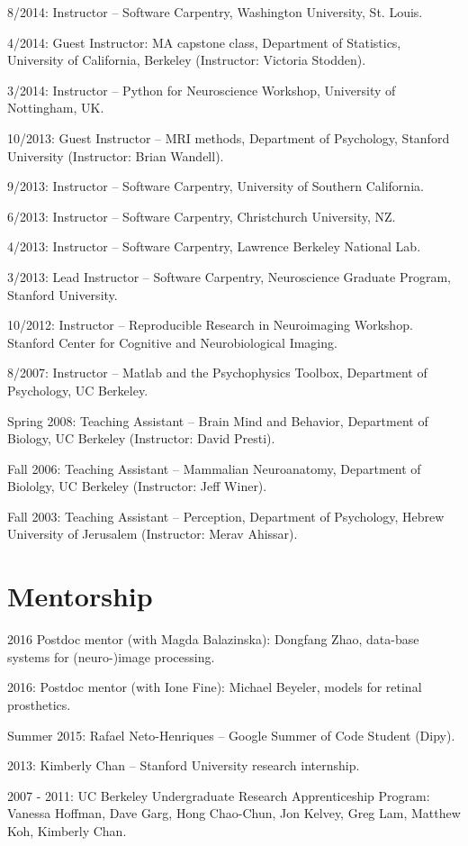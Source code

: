 \documentclass[11pt,fullpage]{article}
\begin{document}
8/2014: Instructor -- Software Carpentry, Washington University, St. Louis.

4/2014: Guest Instructor: MA capstone class, Department of Statistics, University of California, Berkeley (Instructor: Victoria Stodden).

3/2014: Instructor -- Python for Neuroscience Workshop, University of Nottingham, UK.

10/2013: Guest Instructor -- MRI methods, Department of Psychology, Stanford University (Instructor: Brian Wandell).

9/2013: Instructor -- Software Carpentry, University of Southern California.

6/2013: Instructor -- Software Carpentry, Christchurch University, NZ.

4/2013: Instructor -- Software Carpentry, Lawrence Berkeley National Lab.

3/2013: Lead Instructor -- Software Carpentry, Neuroscience Graduate Program, Stanford University.

10/2012: Instructor -- Reproducible Research in Neuroimaging Workshop. Stanford Center for Cognitive and Neurobiological Imaging.

8/2007: Instructor -- Matlab and the Psychophysics Toolbox, Department of Psychology, UC Berkeley.

Spring 2008: Teaching Assistant -- Brain Mind and Behavior, Department of Biology, UC Berkeley (Instructor: David Presti).

Fall 2006: Teaching Assistant -- Mammalian Neuroanatomy, Department of Biololgy, UC Berkeley (Instructor: Jeff Winer).

Fall 2003: Teaching Assistant -- Perception, Department of Psychology, Hebrew University of Jerusalem (Instructor: Merav Ahissar).

\section*{Mentorship}

2016 Postdoc mentor (with Magda Balazinska): Dongfang Zhao, data-base systems for (neuro-)image processing.

2016: Postdoc mentor (with Ione Fine): Michael Beyeler, models for retinal prosthetics.

Summer 2015: Rafael Neto-Henriques -- Google Summer of Code Student (Dipy).

2013: Kimberly Chan -- Stanford University research internship.

2007 - 2011: UC Berkeley Undergraduate Research Apprenticeship Program: Vanessa Hoffman, Dave Garg, Hong Chao-Chun, Jon Kelvey, Greg Lam, Matthew Koh, Kimberly Chan.
\end{document}
